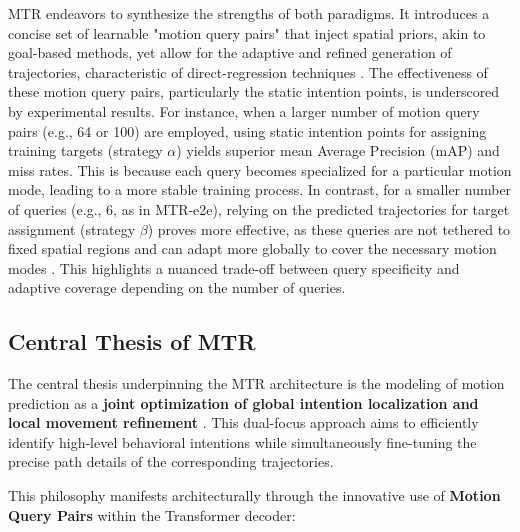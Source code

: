 MTR endeavors to synthesize the strengths of both paradigms. It introduces a concise set of learnable "motion query pairs" that inject spatial priors, akin to goal-based methods, yet allow for the adaptive and refined generation of trajectories, characteristic of direct-regression techniques \cite{Shi2022MTR, Shi2022MTR_A}. The effectiveness of these motion query pairs, particularly the static intention points, is underscored by experimental results. For instance, when a larger number of motion query pairs (e.g., 64 or 100) are employed, using static intention points for assigning training targets (strategy $\alpha$) yields superior mean Average Precision (mAP) and miss rates. This is because each query becomes specialized for a particular motion mode, leading to a more stable training process. In contrast, for a smaller number of queries (e.g., 6, as in MTR-e2e), relying on the predicted trajectories for target assignment (strategy $\beta$) proves more effective, as these queries are not tethered to fixed spatial regions and can adapt more globally to cover the necessary motion modes \cite{Shi2022MTR}. This highlights a nuanced trade-off between query specificity and adaptive coverage depending on the number of queries.

\subsection{Central Thesis of MTR}
\label{subsec:central_thesis}

The central thesis underpinning the MTR architecture is the modeling of motion prediction as a \textbf{joint optimization of global intention localization and local movement refinement} \cite{Shi2022MTR}. This dual-focus approach aims to efficiently identify high-level behavioral intentions while simultaneously fine-tuning the precise path details of the corresponding trajectories.

This philosophy manifests architecturally through the innovative use of \textbf{Motion Query Pairs} within the Transformer decoder:

